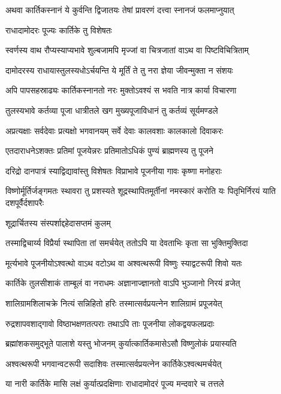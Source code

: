 \twolineshloka
{अथवा कार्तिकस्नानं ये कुर्वन्ति द्विजातयः}
{तेषां प्रावरणं दत्त्वा स्नानजं फलमाप्नुयात्} %


\onelineshloka
{राधादामोदरः पूज्यः कार्तिके तु विशेषतः} %

\twolineshloka
{स्वर्णस्य वाथ रौप्यस्याप्यभावे शुल्बजामपि}
{मृज्जां वा चित्रजातां वाऽथ वा पिष्टविचित्रिताम्} %

\twolineshloka
{दामोदरस्य राधायास्तुलस्यधोऽर्चयन्ति ये}
{मूर्तिं ते तु नरा ज्ञेया जीवन्मुक्ता न संशयः} %

\twolineshloka
{अपि पापसहस्राढ्यः कार्तिकस्नानतो नरः}
{मुक्तोऽवश्यं स भवति नात्र कार्या विचारणा} %

\twolineshloka
{तुलस्यभावे कर्तव्या पूजा धात्रीतले खग}
{मुख्यपूजाविधानं तु कर्तव्यं सूर्यमण्डले} %

\twolineshloka
{अप्रत्यक्षाः सर्वदेवाः प्रत्यक्षो भगवानयम्}
{सर्वे देवाः कालवशाः कालकालो दिवाकरः} %

\twolineshloka
{एतदाराधनेऽशक्तः प्रतिमां पूजयेन्नरः}
{प्रतिमातोऽधिकं पुण्यं ब्राह्मणस्य तु पूजने} %

\twolineshloka
{दरिद्रो दानपात्रं स्याद्विद्यावांस्तु विशेषतः}
{विप्राभावे पूजनीया गावः कृष्णा मनोहराः} %

\threelineshloka
{विष्णोर्मूर्तिर्जङ्गमतः स्थावरा तु प्रशस्यते}
{शूद्रस्थापितमूर्तीनां नमस्कारं करोति यः}
{पितृभिर्निरयं याति दशपूर्वैर्दशापरैः} %


\onelineshloka
{शूद्रार्चितस्य संस्पर्शाद्दहेदासप्तमं कुलम्} %

\twolineshloka
{तस्माद्विचार्य्य विप्रैर्या स्थापिता तां समर्चयेत्}
{ततोऽपि या देवताभिः कृता सा भुक्तिमुक्तिदा} %

\twolineshloka
{मूर्त्यभावे पूजनीयोऽश्वत्थो वाऽथ वटोऽथ वा}
{अश्वत्थरूपी विष्णुः स्याद्वटरूपी शिवो यतः} %

\twolineshloka
{कार्तिके तुलसीशाकं ताम्बूलं वा नराधमः}
{अज्ञानाज्ज्ञानतो वाऽपि भुञ्जानो निरयं व्रजेत्} %

\twolineshloka
{शालिग्रामशिलाचक्रे नित्यं सन्निहितो हरिः}
{तस्मात्सर्वप्रयत्नेन शालिग्रामं प्रपूजयेत्} %

\twolineshloka
{रुद्रशापवशाद्गावो विष्ठाभक्षणतत्पराः}
{तथाऽपि ताः पूजनीया लोकद्वयफलप्रदाः} %

\twolineshloka
{ब्रह्मांशकसमुद्भूते पालाशे यस्तु भोजनम्}
{कुर्यात्कार्तिकमासेऽसौ विष्णुलोकं प्रयास्यति} %

\twolineshloka
{अश्वत्थरूपी भगवान्वटरूपी सदाशिवः}
{तस्मात्सर्वप्रयत्नेन कार्तिकेऽश्वत्थमर्चयेत्} %

\twolineshloka
{या नारी कार्तिके मासि लक्षं कुर्यात्प्रदक्षिणाः}
{राधादामोदरं पूज्य मन्दवारे च तत्तले} %

